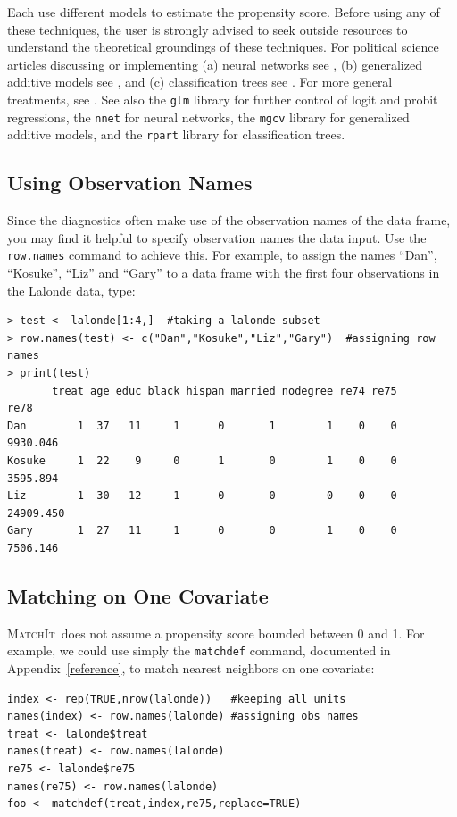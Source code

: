 \documentclass[oneside,letterpaper,titlepage]{article}
\newcommand{\MatchIt}{\textsc{MatchIt}}
\begin{document}
Each use different models to estimate the propensity score.  Before
using any of these techniques, the user is strongly advised to seek
outside resources to understand the theoretical groundings of these
techniques.  For political science articles discussing or implementing
(a) neural networks see \citet{beck99,Zeng99,Zeng00,LagRus02}, (b)
generalized additive models see \citet{BecJac98}, and (c)
classification trees see \citet{RugKimMar03}.  For more general
treatments, see \citet{Bishop95,White92,BreFriOls84}.  See also the
\texttt{glm} library for further control of logit and probit
regressions, the \texttt{nnet} for neural networks, the \texttt{mgcv}
library for generalized additive models, and the \texttt{rpart}
library for classification trees.

\subsection{Using Observation Names}
\label{rnames}

Since the diagnostics often make use of the observation names of the
data frame, you may find it helpful to specify observation names the
data input.  Use the \texttt{row.names} command to achieve this.  For
example, to assign the names ``Dan'', ``Kosuke'', ``Liz'' and ``Gary''
to a data frame with the first four observations in the Lalonde data,
type:

\begin{verbatim}
> test <- lalonde[1:4,]  #taking a lalonde subset
> row.names(test) <- c("Dan","Kosuke","Liz","Gary")  #assigning row names
> print(test)
       treat age educ black hispan married nodegree re74 re75      re78
Dan        1  37   11     1      0       1        1    0    0  9930.046
Kosuke     1  22    9     0      1       0        1    0    0  3595.894
Liz        1  30   12     1      0       0        0    0    0 24909.450
Gary       1  27   11     1      0       0        1    0    0  7506.146
\end{verbatim} 

\subsection{Matching on One Covariate}
\MatchIt\ does not assume a propensity score bounded between 0 and 1.
For example, we could use simply the \texttt{matchdef} command,
documented in Appendix~\ref{reference}, to match nearest neighbors on
one covariate:

\begin{verbatim}
index <- rep(TRUE,nrow(lalonde))   #keeping all units
names(index) <- row.names(lalonde) #assigning obs names
treat <- lalonde$treat
names(treat) <- row.names(lalonde)
re75 <- lalonde$re75
names(re75) <- row.names(lalonde)
foo <- matchdef(treat,index,re75,replace=TRUE)
\end{verbatim}
\end{document}
